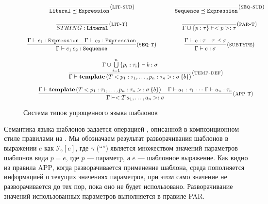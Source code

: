 \newcommand{\trule}[3]{%
\dfrac{#1}{#2}(\mbox{\textsc{#3}})%
}%
%
\begin{figure}[htbp]
$$
\begin{array}{ccc}
\trule{}{\mathtt{Literal} \preceq \mathtt{Expression}}{lit-sub}
&&
\trule{}{\mathtt{Sequence} \preceq \mathtt{Expression}}{seq-sub}
\\
&&\,\\
\trule{}{STRING : \mathtt{Literal}}{lit-t}
&\quad&
\trule{}{\Gamma \cup \{p : \tau\} \vdash <p> : \tau}{par-t}
\\
&&\,\\
%
\trule{
	\Gamma \vdash e_1 : \mathtt{Expression} 
	\quad 
	\Gamma \vdash e_2 : \mathtt{Expression}
}{
	\Gamma \vdash e_1 \, e_2 : \mathtt{Sequence}
}{seq-t}
&&
\trule{
	\Gamma \vdash e : \tau
	\quad 
	\tau \preceq \sigma 
}{
	\Gamma \vdash e : \sigma
}{subtype}
\\
&&\,\\
\multicolumn{3}{c}{
\trule{
	\Gamma \cup \bigcup\limits_{i=1}^{n} \{ p_i : \tau_i \} \vdash b : \sigma
}{
	\Gamma \vdash \mathbf{template}\left(
		T <p_1 : \tau_1, \ldots, p_n : \tau_n> \,: \sigma \, \{ b \}
	\right)
}{temp-def}
}
\\
&&\,\\
\multicolumn{3}{c}{
\trule{
	\Gamma \vdash \mathbf{template}\left(
		T <p_1 : \tau_1, \ldots, p_n : \tau_n> \,: \sigma \, \{ b \}
	\right)
	\quad
	\Gamma \vdash a_1 : \tau_1 \, \cdots \, \Gamma \vdash a_n : \tau_n
}{
	\Gamma \vdash <T \, a_1, \ldots, a_n> : \sigma
}{app-t}
}
\end{array}
$$
	\caption{Система типов упрощенного языка шаблонов}\label{TempTypes}
\end{figure}

\newcommand{\Inst}[2]{\mathcal{I}_{#1} \left[ #2 \right]}%
Семантика языка шаблонов задается операцией , описанной в композиционном стиле правилами на . Мы обозначаем результат разворачивания шаблонов в выражении $e$ как $\Inst{\gamma}{e}$, где $\gamma$ (``'') является множеством значений параметров шаблонов вида $p = e$, где $p$ --- параметр, а $e$ --- шаблонное выражение. Как видно из правила \textsc{APP}, когда разворачивается применение шаблона, среда пополняется информацией о текущих значениях параметров, при этом само значение не разворачивается до тех пор, пока оно не будет использовано. Разворачивание значений использованных параметров выполняется в правиле \textsc{PAR}.

